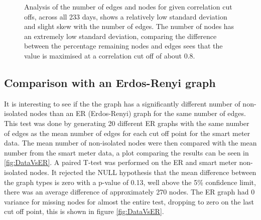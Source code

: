 \begin{figure}[ht]
\caption[Number of edges analysis]{Analysis of the number of edges and nodes for given correlation cut offs, across all 233 days, shows a relatively low standard deviation and slight skew with the number of edges. The number of nodes has an extremely low standard deviation, comparing the difference between the percentage remaining nodes and edges sees that the value is maximised at a correlation cut off of about 0.8. }
\label{fig:EdgeNodeAnalysis}
\end{figure}


\subsection{Comparison with an Erdos-Renyi graph}

It is interesting to see if the the graph has a significantly different number of non-isolated nodes than an ER (Erdos-Renyi) graph for the same number of edges. This test was done by generating 20 different ER graphs with the same number of edges as the mean number of edges for each cut off point for the smart meter data. The mean number of non-isolated nodes were then compared with the mean number from the smart meter data, a plot comparing the results can be seen in \ref{fig:DataVsER}. A paired T-test was performed on the ER and smart meter non-isolated nodes. It rejected the NULL hypothesis that the mean difference between the graph types is zero with a p-value of 0.13, well above the 5\% confidence limit, there was an average difference of approximately 270 nodes. The ER graph had 0 variance for missing nodes for almost the entire test, dropping to zero on the last cut off point, this is shown in figure \ref{fig:DataVsER}. 

